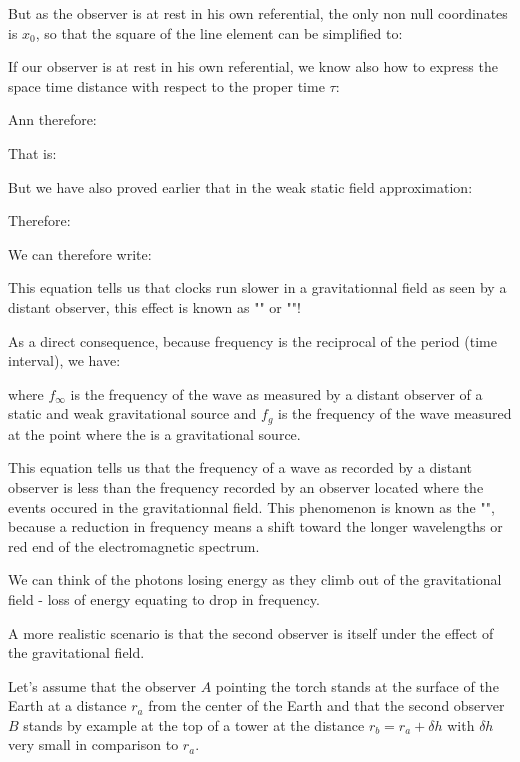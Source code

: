 	But as the observer is at rest in his own referential, the only non null coordinates is $x_0$, so that the square of the line element can be simplified to:
	
	If our observer is at rest in his own referential, we know also how to express the space time distance with respect to the proper time $\tau$:
	
	Ann therefore:
	
	That is:
	
	But we have also proved earlier that in the weak static field approximation:
	
	Therefore:
	
	We can therefore write:
	
	This equation tells us that clocks run slower in a gravitationnal field as seen by a distant observer, this effect is known as "" or ""!
	
	As a direct consequence, because frequency is the reciprocal of the period (time interval), we have:
	
	 
	where $f_{\infty}$ is the frequency of the wave as measured by a distant observer of a static and weak gravitational source and $f_g$ is the frequency of the wave measured at the point where the is a gravitational source.
	
	This equation tells us that the frequency of a wave as recorded by a distant observer is less than the frequency recorded by an observer located where the events occured in the gravitationnal field. This phenomenon is known as the "", because a reduction in frequency means a shift toward the longer wavelengths or red end of the electromagnetic spectrum.
	
	We can think of the photons losing energy as they climb out of the gravitational field - loss of energy equating to drop in frequency.
	
	A more realistic scenario is that the second observer is itself under the effect of the gravitational field.

	Let's assume that the observer $A$ pointing the torch stands at the surface of the Earth at a distance $r_a$ from the center of the Earth and that the second observer $B$ stands by example at the top of a tower at the distance $r_b = r_a + \delta h$ with $\delta h$ very small in comparison to $r_a$.
	
